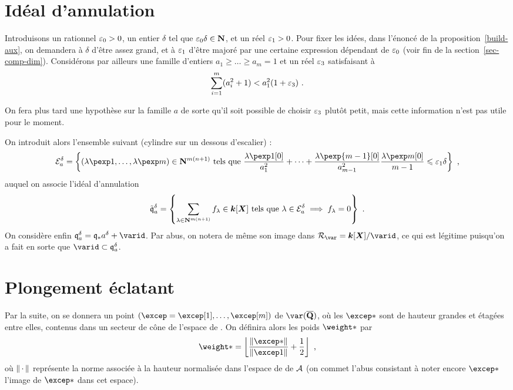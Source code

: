 \section{Idéal d'annulation}

Introduisons un rationnel ${\varepsilon_0} > 0$, un entier $\delta$ tel que
${\varepsilon_0}\delta \in {\mathbf{N}}$, et un réel ${\varepsilon_1} > 0$. Pour fixer les idées, dans
l'énoncé de la proposition~\ref{build-aux}, on demandera à $\delta$ d'être
assez grand, et à ${\varepsilon_1}$ d'être majoré par une certaine expression dépendant
de ${\varepsilon_0}$ (voir fin de la section~\ref{sec-comp-dim}). Considérons par
ailleurs une famille d'entiers $a_1 \ge \dots \ge a_m = 1$ et un réel
${\varepsilon_3}$ satisfaisant à
\[
  \sum_{i=1}^m (a_i^2 + 1) < a_1^2 (1 + {\varepsilon_3})
  \text{ .}
\]

On fera plus tard une hypothèse sur la famille $a$ de sorte qu'il soit
possible de choisir ${\varepsilon_3}$ plutôt petit, mais cette information n'est pas
utile pour le moment.

On introduit alors l'ensemble suivant (cylindre sur un dessous d'escalier) :
\[
  \Stairs_a^\delta = \left\{
    (\lambda\pexp1, \dots, \lambda\pexp\puiss) \in \N^{m(n+1)}
    \text{ tels que }
    \frac {\lambda\pexp1[0]} {a_1^2}
    + \dots +
    \frac {\lambda\pexp{\puiss-1}[0]} {a_{\puiss-1}^2}
    \frac {\lambda\pexp\puiss[0]} {\puiss-1}
    \le \epsi \delta
    \right\}
  \pmm,
\]
auquel on associe l'idéal d'annulation
\[
  \Vanish*_a^\delta = \left\{
    \sum_{\lambda \in \N^{\puiss(\dimp+1)}} f_\lambda
    \in \cdn [\cmmh]
    \text{ tels que }
    \lambda \in \Stairs_a^\delta
    \implies
    f_\lambda = 0
    \right\}
  \pmm.
\]
On considère enfin $\Vanish_a^\delta = \Vanish_*a^\delta + \varid$. Par abus,
on notera de même son image dans $\ring\var = \cdn [\cmmh] / \varid$, ce qui
est légitime puisqu'on a fait en sorte que $\varid \subset \Vanish_a^\delta$.

\section{Plongement éclatant}

Par la suite, on se donnera un point
$(\excep = \excep[1], \dots, \excep[\puiss])$
de $\var(\Qbar)$, où les $\excep*$ sont de hauteur grandes et étagées entre
elles, contenus dans un secteur de cône de l'espace de . On
définira alors les poids $\weight*$ par
\begin{equation}
  \weight* =
  \left\lfloor
  \frac {\norm{\excep*}} {\norm{\excep1}}
  + \frac12
  \right\rfloor
  \pmm,
\end{equation}
où $\lVert{\,\cdot\,}\rVert$ représente la norme associée à la hauteur normalisée dans
l'espace de  de $\mathcal A$ (on commet l'abus consistant à noter
encore $\excep*$ l'image de $\excep*$ dans cet espace).


